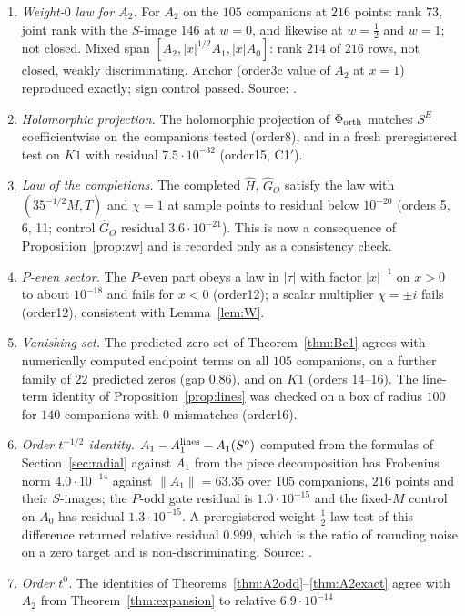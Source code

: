 \begin{enumerate}[label=D.\arabic*,leftmargin=3em]
\item\label{catB:4b} \emph{Weight-$0$ law for $A_2$.} For $A_2$ on the $105$ companions at $216$ points: rank $73$, joint rank with the $S$-image $146$ at $w=0$,
and likewise at $w=\frac12$ and $w=1$; not closed. Mixed span $[A_2,|x|^{1/2}A_1,|x|A_0]$: rank $214$ of $216$ rows, not closed, weakly
discriminating. Anchor (order3c value of $A_2$ at $x=1$) reproduced exactly; sign control passed. Source: .
\item\label{catB:sh1} \emph{Holomorphic projection.} The holomorphic projection of $\Phi_{\rm orth}$ matches $S^E$ coefficientwise on the companions tested (order8), and in a
fresh preregistered test on $K1$ with residual $7.5\cdot10^{-32}$ (order15, C1$'$).
\item\label{catB:sh2} \emph{Law of the completions.} The completed $\widehat H$, $\widehat G_O$ satisfy the law with $(35^{-1/2}M,T)$ and $\chi=1$ at sample points to residual
below $10^{-20}$ (orders 5, 6, 11; control $\widehat G_O$ residual $3.6\cdot10^{-21}$). This is now a consequence of Proposition~\ref{prop:zw} and is recorded only as a consistency check.
\item\label{catB:sh3} \emph{$P$-even sector.} The $P$-even part obeys a law in $|\tau|$ with factor $|x|^{-1}$ on $x>0$ to about $10^{-18}$ and fails for $x<0$ (order12); a
scalar multiplier $\chi=\pm i$ fails (order12), consistent with Lemma~\ref{lem:W}.
\item\label{catB:sh4} \emph{Vanishing set.} The predicted zero set of Theorem~\ref{thm:Bc1} agrees with numerically computed endpoint terms on all $105$ companions, on a further
family of $22$ predicted zeros (gap $0.86$), and on $K1$ (orders 14--16). The line-term identity of Proposition~\ref{prop:lines} was checked on a box of radius $100$ for
$140$ companions with $0$ mismatches (order16).
\item\label{catB:sh5} \emph{Order $t^{-1/2}$ identity.} $A_1-A_1^{\rm lines}-A_1(S^o)$ computed from the formulas of Section~\ref{sec:radial} against $A_1$ from the piece decomposition
has Frobenius norm $4.0\cdot10^{-14}$ against $\|A_1\|=63.35$ over $105$ companions, $216$ points and their $S$-images; the $P$-odd gate residual is $1.0\cdot10^{-15}$ and the fixed-$M$
control on $A_0$ has residual $1.3\cdot10^{-15}$. A preregistered weight-$\frac12$ law test of this difference returned relative residual $0.999$, which is the ratio of rounding
noise on a zero target and is non-discriminating. Source: .
\item\label{catB:o19} \emph{Order $t^0$.} The identities of Theorems~\ref{thm:A2odd}--\ref{thm:A2exact} agree with $A_2$ from Theorem~\ref{thm:expansion} to relative $6.9\cdot10^{-14}$

\end{enumerate}
